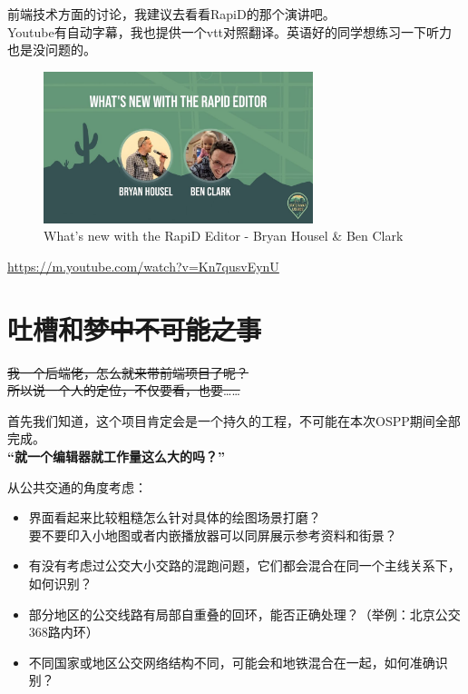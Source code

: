 \documentclass{beamer}
\begin{document}
\begin{frame}
    前端技术方面的讨论，我建议去看看RapiD的那个演讲吧。\\
    Youtube有自动字幕，我也提供一个vtt对照翻译。英语好的同学想练习一下听力也是没问题的。 \\
    

    \begin{figure}[H]
        \centering
        \includegraphics[width=0.7\textwidth]{figure/youtube-Kn7qusvEynU.jpg}
        \caption{What's new with the RapiD Editor - Bryan Housel \& Ben Clark}
    \end{figure}

    \url{https://m.youtube.com/watch?v=Kn7qusvEynU}
\end{frame}

\section{吐槽和\sout{梦中不可能之事}}

\begin{frame}
    \Large
    \sout{我一个后端佬，怎么就来带前端项目了呢？}\\
    \sout{所以说一个人的定位，不仅要看，也要……}
\end{frame}

\begin{frame}
    \large
    \quad \quad 首先我们知道，这个项目肯定会是一个持久的工程，不可能在本次OSPP期间全部完成。\\
    \vspace{4em}
    \quad \quad \textbf{“就一个编辑器就工作量这么大的吗？”}
\end{frame}


\begin{frame}
    \Large
    从公共交通的角度考虑：\\
    \normalsize
    \begin{itemize}
        \item 界面看起来比较粗糙怎么针对具体的绘图场景打磨？\\
        要不要印入小地图或者内嵌播放器可以同屏展示参考资料和街景？
        \item  有没有考虑过公交大小交路的混跑问题，它们都会混合在同一个主线关系下，如何识别？
        \item 部分地区的公交线路有局部自重叠的回环，能否正确处理？（举例：北京公交368路内环）
        \item 不同国家或地区公交网络结构不同，可能会和地铁混合在一起，如何准确识别？
    \end{itemize}
    
\end{frame}
\end{document}

